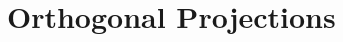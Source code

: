 \documentclass[10pt]{beamer}
\theoremstyle{definition}
\newtheorem{defi}{Definition}[section]
\begin{document}
%
\section{Orthogonal Projections}
\end{document}
